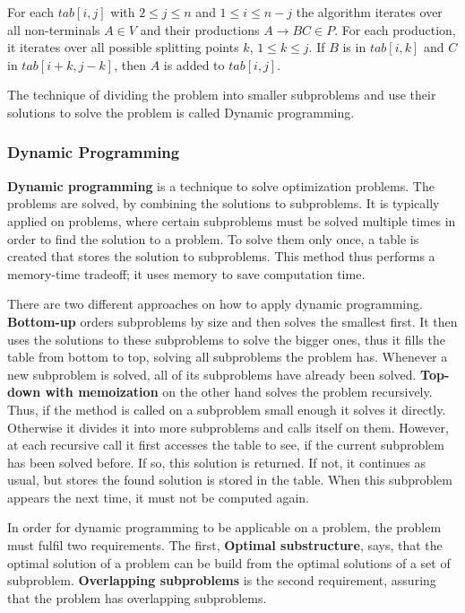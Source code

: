 For each $tab[i,j]$ with $2\leq j \leq n$ and $1\leq i \le n-j$ the algorithm iterates over all non-terminals $A\in V$ and their productions $A\rightarrow BC \in P$.
For each production, it iterates over all possible splitting points $k$, $1\leq k\le j$.
If $B$ is in $tab[i, k]$ and $C$ in $tab[i+k,j-k]$, then $A$ is added to $tab[i,j]$.

The technique of dividing the problem into smaller subproblems and use their solutions to solve the problem is called Dynamic programming.

\subsubsection{Dynamic Programming}
\label{sec:dynamic_programming}
\textbf{Dynamic programming} is a technique to solve optimization problems.
The problems are solved, by combining the solutions to subproblems.
It is typically applied on problems, where certain subproblems must be solved multiple times in order to find the solution to a problem.
To solve them only once, a table is created that stores the solution to subproblems.
This method thus performs a memory-time tradeoff; it uses memory to save computation time.

There are two different approaches on how to apply dynamic programming.
\textbf{Bottom-up} orders subproblems by size and then solves the smallest first.
It then uses the solutions to these subproblems to solve the bigger ones, thus it fills the table from bottom to top, solving all subproblems the problem has.
Whenever a new subproblem is solved, all of its subproblems have already been solved.
\textbf{Top-down with memoization} on the other hand solves the problem recursively.
Thus, if the method is called on a subproblem small enough it solves it directly.
Otherwise it divides it into more subproblems and calls itself on them.
However, at each recursive call it first accesses the table to see, if the current subproblem has been solved before.
If so, this solution is returned.
If not, it continues as usual, but stores the found solution is stored in the table.
When this subproblem appears the next time, it must not be computed again.

In order for dynamic programming to be applicable on a problem, the problem must fulfil two requirements.
The first, \textbf{Optimal substructure}, says, that the optimal solution of a problem can be build from the optimal solutions of a set of subproblem.
\textbf{Overlapping subproblems} is the second requirement, assuring that the problem has overlapping subproblems.


